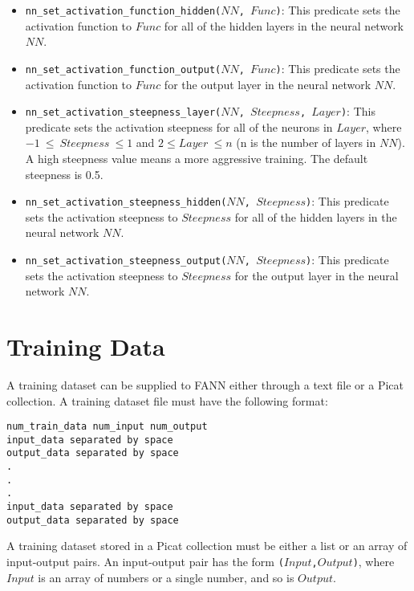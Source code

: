 \begin{itemize}
\item \texttt{nn\_set\_activation\_function\_hidden($NN$, $Func$)}: This predicate sets the activation function to $Func$ for all of the hidden layers in the neural network $NN$.

\item \texttt{nn\_set\_activation\_function\_output($NN$, $Func$)}: This predicate sets the activation function to $Func$ for the output layer in the neural network $NN$.

\item \texttt{nn\_set\_activation\_steepness\_layer($NN$, $Steepness$, $Layer$)}: This predicate sets the activation steepness for all of the neurons in $Layer$, where $-1\ \le\ Steepness\ \le 1$ and $2 \le Layer\ \le n$ (n is the number of layers in $NN$).  A high steepness value means a more aggressive training. The default steepness is 0.5.

\item \texttt{nn\_set\_activation\_steepness\_hidden($NN$, $Steepness$)}: This predicate sets the activation steepness to $Steepness$ for all of the hidden layers in the neural network $NN$.

\item \texttt{nn\_set\_activation\_steepness\_output($NN$, $Steepness$)}: This predicate sets the activation steepness to $Steepness$ for the output layer in the neural network $NN$.
\end{itemize}

\section{Training Data}
A training dataset can be supplied to FANN either through a text file or a Picat collection. A training dataset file must have the following format:

\begin{verbatim}
num_train_data num_input num_output
input_data separated by space
output_data separated by space
.
.
.
input_data separated by space
output_data separated by space
\end{verbatim}
A training dataset stored in a Picat collection must be either a list or an array of input-output pairs. An input-output pair has the form \texttt{($Input$,$Output$)}, where $Input$ is an array of numbers or a single number, and so is $Output$.

